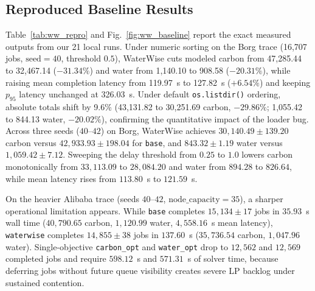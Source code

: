 \documentclass[conference]{IEEEtran}
\begin{document}
\subsection{Reproduced Baseline Results}
Table~\ref{tab:ww_repro} and Fig.~\ref{fig:ww_baseline} report the exact measured outputs from our 21 local runs. Under numeric sorting on the Borg trace (16,707 jobs, $\mathrm{seed}=40$, threshold $0.5$), WaterWise cuts modeled carbon from 47,285.44 to 32,467.14 ($-31.34\%$) and water from 1,140.10 to 908.58 ($-20.31\%$), while raising mean completion latency from 119.97~s to 127.82~s ($+6.54\%$) and keeping $p_{95}$ latency unchanged at 326.03~s. Under default \texttt{os.listdir()} ordering, absolute totals shift by 9.6\% (43,131.82 to 30,251.69 carbon, $-29.86\%$; 1,055.42 to 844.13 water, $-20.02\%$), confirming the quantitative impact of the loader bug. Across three seeds ($40$--$42$) on Borg, WaterWise achieves $30{,}140.49 \pm 139.20$ carbon versus $42{,}933.93 \pm 198.04$ for \texttt{base}, and $843.32 \pm 1.19$ water versus $1{,}059.42 \pm 7.12$. Sweeping the delay threshold from $0.25$ to $1.0$ lowers carbon monotonically from $33{,}113.09$ to $28{,}084.20$ and water from $894.28$ to $826.64$, while mean latency rises from $113.80$~s to $121.59$~s.

On the heavier Alibaba trace (seeds $40$--$42$, $\mathrm{node\_capacity}=35$), a sharper operational limitation appears. While \texttt{base} completes $15{,}134 \pm 17$ jobs in $35.93$~s wall time ($40{,}790.65$ carbon, $1{,}120.99$ water, $4{,}558.16$~s mean latency), \texttt{waterwise} completes $14{,}855 \pm 38$ jobs in $137.60$~s ($35{,}736.54$ carbon, $1{,}047.96$ water). Single-objective \texttt{carbon\_opt} and \texttt{water\_opt} drop to $12{,}562$ and $12{,}569$ completed jobs and require $598.12$~s and $571.31$~s of solver time, because deferring jobs without future queue visibility creates severe LP backlog under sustained contention.
\end{document}
